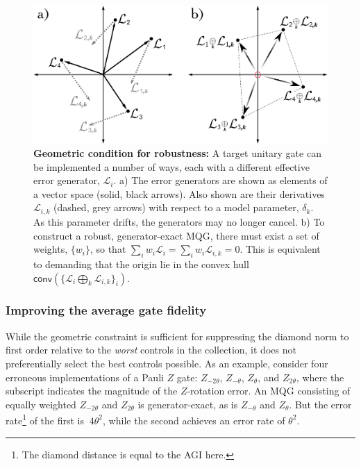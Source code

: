 \documentclass[aps,nofootinbib,pra,notitlepage,twocolumn]{revtex4-1}
\newcommand{\genmat}{\ensuremath{{\mathcal{L}}}}
\newcommand{\0}{\ensuremath{\mathbf{0}}}
\newcommand{\weight}{\ensuremath{w}}
\begin{document}
\begin{figure}
  \centering
  \includegraphics[width=\columnwidth]{vectorspace3.png}
  \caption{\textbf{Geometric condition for robustness:}   A target unitary gate can be implemented a number of ways, each with a different effective error generator, $\genmat_i$. a) The error generators are shown as elements of a vector space (solid, black arrows). Also shown are their derivatives $\genmat_{i,k}$ (dashed, grey arrows) with respect to a model parameter, $\delta_k$. As this parameter drifts, the generators may no longer cancel. b) To construct a robust, generator-exact MQG, there must exist a set of weights, $\{\weight_i\}$, so that $\sum_i \weight_i \genmat_i = \sum_i \weight_i \genmat_{i,k} = 0$. This is equivalent to demanding that the origin lie in the convex hull $\mathsf{conv}(\{\genmat_i \bigoplus_k \genmat_{i,k} \}_i)$. }
  \label{fig:vectorspace2}
\end{figure}



\subsubsection{Improving the average gate fidelity}
\label{sec:norm}
\noindent While the geometric constraint is sufficient for suppressing the diamond norm to first order relative to the \textit{worst} controls in the collection, it does not preferentially select the best controls possible.  As an example, consider four erroneous implementations of a Pauli $Z$ gate: $Z_{-2\theta}$, $Z_{-\theta}$, $Z_{\theta}$, and $Z_{2\theta}$, where the subscript indicates the magnitude of the $Z$-rotation error. An MQG consisting of equally weighted $Z_{-2\theta}$ and $Z_{2\theta}$ is generator-exact, as is $Z_{-\theta}$ and $Z_{\theta}$. But the error rate\footnote{The diamond distance is equal to the AGI here.} of the first is $~4\theta^2$, while the second achieves an error rate of $\theta^2$. 
\end{document}
